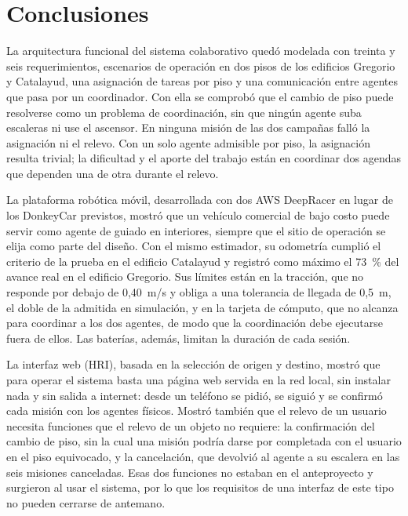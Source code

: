 %
\chapter*{Conclusiones}

La arquitectura funcional del sistema colaborativo quedó modelada con treinta y seis
requerimientos, escenarios de operación en dos pisos de los edificios Gregorio y
Catalayud, una asignación de tareas por piso y una comunicación entre agentes que
pasa por un coordinador. Con ella se comprobó que el cambio de piso puede resolverse
como un problema de coordinación, sin que ningún agente suba escaleras ni use el
ascensor. En ninguna misión de las dos campañas falló la asignación ni el relevo. Con
un solo agente admisible por piso, la asignación resulta trivial; la dificultad y el
aporte del trabajo están en coordinar dos agendas que dependen una de otra durante el
relevo.

La plataforma robótica móvil, desarrollada con dos AWS DeepRacer en lugar de los
DonkeyCar previstos, mostró que un vehículo comercial de bajo costo puede servir como
agente de guiado en interiores, siempre que el sitio de operación se elija como parte
del diseño. Con el mismo estimador, su odometría cumplió el criterio de la prueba en
el edificio Catalayud y registró como máximo el 73~\% del avance real en el edificio
Gregorio. Sus límites están en la tracción, que no responde por debajo de 0,40~m/s y
obliga a una tolerancia de llegada de 0,5~m, el doble de la admitida en simulación, y en
la tarjeta de cómputo, que no alcanza para coordinar a los dos agentes, de modo que la
coordinación debe ejecutarse fuera de ellos. Las baterías, además, limitan la
duración de cada sesión.

La interfaz web (HRI), basada en la selección de origen y destino, mostró que para
operar el sistema basta una página web servida en la red local, sin instalar nada y
sin salida a internet: desde un teléfono se pidió, se siguió y se confirmó cada misión
con los agentes físicos. Mostró también que el relevo de un usuario necesita funciones
que el relevo de un objeto no requiere: la confirmación del cambio de piso, sin la
cual una misión podría darse por completada con el usuario en el piso equivocado, y la
cancelación, que devolvió al agente a su escalera en las seis misiones canceladas.
Esas dos funciones no estaban en el anteproyecto y surgieron al usar el sistema, por
lo que los requisitos de una interfaz de este tipo no pueden cerrarse de antemano.

